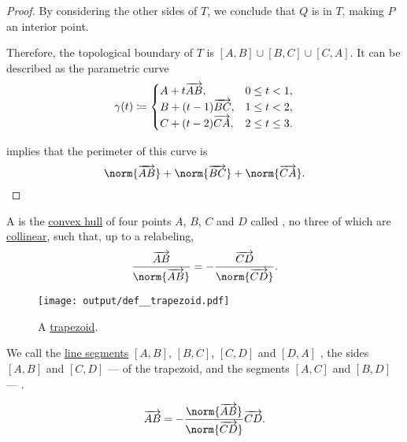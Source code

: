 \begin{proof}
  By considering the other sides of \( T \), we conclude that \( Q \) is in \( T \), making \( P \) an interior point.

  Therefore, the topological boundary of \( T \) is \( [A, B] \cup [B, C] \cup [C, A] \). It can be described as the parametric curve
  \begin{equation*}
    \gamma(t) \coloneqq \begin{cases}
      A + t \overrightarrow{AB},       &0 \leq t < 1, \\
      B + (t - 1) \overrightarrow{BC}, &1 \leq t < 2, \\
      C + (t - 2) \overrightarrow{CA}, &2 \leq t \leq 3.
    \end{cases}
  \end{equation*}

   implies that the perimeter of this curve is
  \begin{equation*}
    \norm{\vect{AB}} + \norm{\vect{BC}} + \norm{\vect{CA}}.
  \end{equation*}
\end{proof}

\begin{definition}\label{def:trapezoid}\mimprovised
  A  is the \hyperref[def:convex_hull]{convex hull} of four points \( A \), \( B \), \( C \) and \( D \) called , no three of which are \hyperref[def:collinear_points]{collinear}, such that, up to a relabeling,
  \begin{equation*}
    \frac {\vect{AB}} {\norm{\vect{AB}}} = -\frac {\vect{CD}} {\norm{\vect{CD}}}.
  \end{equation*}

  \begin{figure}[!ht]
    \centering
    \texttt{[image: output/def\_\_trapezoid.pdf]}
    \caption{A \hyperref[def:trapezoid]{trapezoid}.}\label{fig:def:trapezoid}
  \end{figure}

  We call the \hyperref[def:line_segment]{line segments} \( [A, B] \), \( [B, C] \), \( [C, D] \) and \( [D, A] \) , the sides \( [A, B] \) and \( [C, D] \) ---  of the trapezoid, and the segments \( [A, C] \) and \( [B, D] \) --- .

  \begin{equation*}
    \vect{AB} = -\frac {\norm{\vect{AB}}} {\norm{\vect{CD}}} \vect{CD}.
  \end{equation*}
\end{definition}

